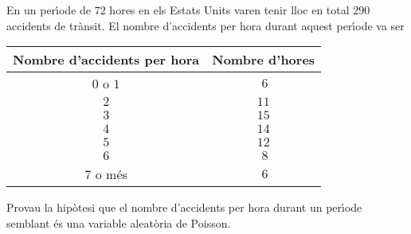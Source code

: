 \begin{probres}
{En un per\'{\i}ode de $72$ hores en els Estats Units varen tenir lloc en
total $290$ accidents de tr\`ansit. 
El nombre d'accidents per hora durant aquest
per\'{\i}ode va ser
\begin{center}
\begin{tabular}{|c|c|}
\hline
Nombre d'accidents per hora & Nombre d'hores \\\hline\hline
$0$ o
$1$&$\ 6$\\\hline
$2$&$11$\\\hline $3$&$15$
\\\hline $4$&$14$\\\hline 
$5$&$12$\\\hline $6$&$\ 8$\\\hline $7$
o m\'es&$\ 6$\\\hline
\end{tabular}
\end{center}
Provau la hip\`otesi que el nombre d'accidents
per hora durant un per\'{\i}ode semblant \'es una variable aleat\`oria de Poisson.}
\end{probres} 


